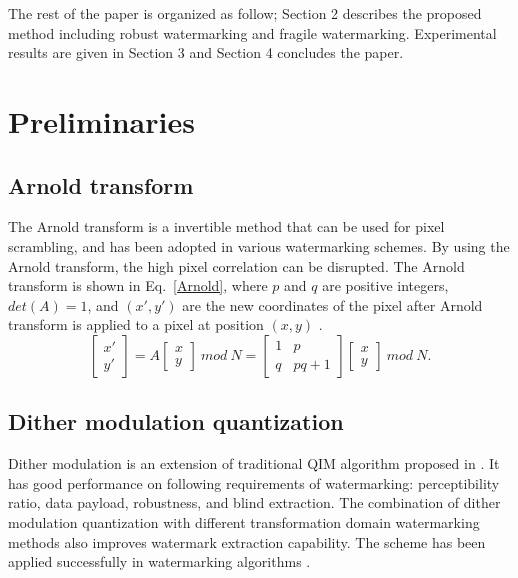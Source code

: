 \documentclass[runningheads]{llncs}
\begin{document}
The rest of the paper is organized as follow; Section 2 describes the proposed method including robust watermarking and fragile watermarking. Experimental results are given in Section 3 and Section 4 concludes the paper.

\section{Preliminaries}
\subsection{Arnold transform}
The Arnold transform is a invertible method that can be used for pixel scrambling, and has been adopted in various watermarking schemes. By using the Arnold transform, the high pixel correlation can be disrupted. The Arnold transform is shown in Eq.~\ref{Arnold}, where $p$ and $q$ are positive integers, $det(A) = 1$, and $(x', y')$ are the new coordinates of the pixel after Arnold transform is applied to a pixel at position $(x, y)$ \cite{Chow2017}.
\begin{equation}
\left[\begin{array}{c}x'\\y'\end{array}\right]=A\left[\begin{array}{c}x\\y\end{array}\right]\ mod\ N=\left[\begin{array}{cc}1 & p\\q & pq+1\end{array}\right]\left[\begin{array}{c}x\\y\end{array}\right]\ mod\ N.
\label{Arnold}
\end{equation}

\subsection{Dither modulation quantization}
Dither modulation is an extension of traditional QIM algorithm proposed in \cite{chen2001quantization}. It has good performance on following requirements of watermarking: perceptibility ratio, data payload, robustness, and blind extraction. The combination of dither modulation quantization with different transformation domain watermarking methods also improves watermark extraction capability. The scheme has been applied successfully in watermarking algorithms \cite{avila2018watermarking,deng2009local,papakostas2014moment,zhu2016optimal}.
\end{document}
